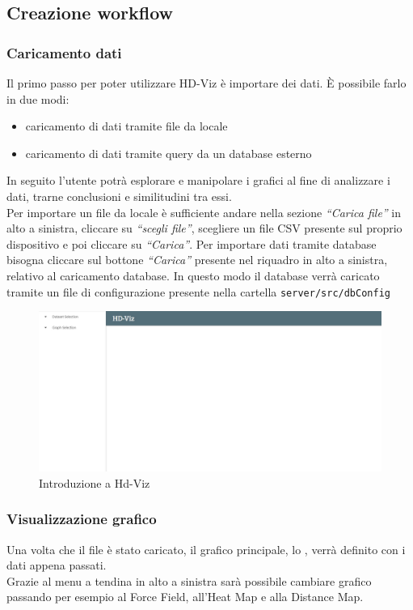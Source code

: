 \documentclass[../manuale_utente.tex]{subfiles}
\begin{document}
\subsection{Creazione workflow}
    \label{sub:crea_work}
\subsubsection{Caricamento dati}
    \label{subsub:carica_dati}

Il primo passo per poter utilizzare HD-Viz è importare dei dati. È possibile farlo in due modi:
\begin{itemize}
    \item caricamento di dati tramite file  da locale
    \item caricamento di dati tramite query da un database esterno
\end{itemize}
In seguito l’utente potrà esplorare e manipolare i grafici al fine di analizzare i dati, trarne conclusioni e similitudini tra essi. \\
Per importare un file da locale è sufficiente andare nella sezione \emph{“Carica file”}  in alto a sinistra, cliccare su \emph{“scegli file”}, 
scegliere un file CSV presente sul proprio dispositivo e poi cliccare su \emph{“Carica”}. 
Per importare dati tramite database bisogna cliccare sul bottone \emph{“Carica”} presente nel riquadro in alto a sinistra, relativo al caricamento database.
In questo modo il database verrà caricato tramite un file di configurazione presente nella cartella  \verb|server/src/dbConfig|

\begin{figure}[H]
	\centering
	\includegraphics[width=18cm]{img/introduzione.jpg}
	\caption{Introduzione a Hd-Viz}
\end{figure}


\subsubsection{Visualizzazione grafico}
    \label{subsub:vis_graf}
Una volta che il file è stato caricato, il grafico principale, lo , verrà definito con i dati appena passati. \\
Grazie al menu a tendina in alto a sinistra sarà possibile cambiare grafico passando per esempio al Force Field, all’Heat Map e alla Distance Map.
\end{document}
